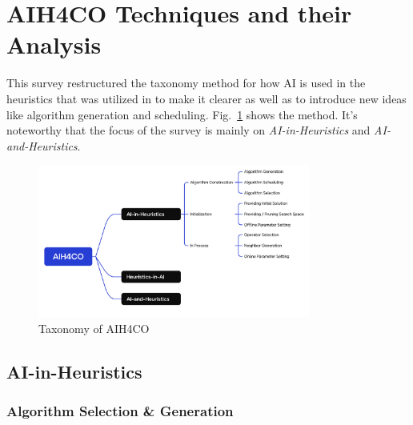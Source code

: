 \documentclass[a4paper]{article}
\begin{document}

\section{AIH4CO Techniques and their Analysis}
This survey restructured the taxonomy method for how AI is used in the heuristics that was utilized in \citet{Maryam}  to make it clearer as well as to introduce new ideas like algorithm generation and scheduling. Fig.~\ref{fig:Tax} shows the method. It's noteworthy that the focus of the survey is mainly on \textit{AI-in-Heuristics} and \textit{AI-and-Heuristics}.

\begin{figure}[h]
\centering
\includegraphics[width=0.8\textwidth]{figures/Taxonomy.png}
    \caption{\label{fig:Tax}Taxonomy of AIH4CO}
\end{figure}

\subsection{AI-in-Heuristics}
\subsubsection{Algorithm Selection \& Generation}
\label{sec:ASG}
\end{document}
